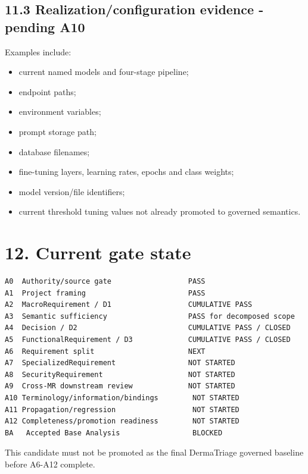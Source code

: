 \documentclass[11pt,a4paper]{article}
\providecommand{\tightlist}{\setlength{\itemsep}{0pt}\setlength{\parskip}{0pt}}
\begin{document}
\subsection{11.3 Realization/configuration evidence - pending
A10}\label{113-realizationconfiguration-evidence---pending-a10}

Examples include:

\begin{itemize}
\tightlist
\item
  current named models and four-stage pipeline;
\item
  endpoint paths;
\item
  environment variables;
\item
  prompt storage path;
\item
  database filenames;
\item
  fine-tuning layers, learning rates, epochs and class weights;
\item
  model version/file identifiers;
\item
  current threshold tuning values not already promoted to governed
  semantics.
\end{itemize}

\section{12. Current gate state}\label{12-current-gate-state}

\begin{verbatim}
A0  Authority/source gate                  PASS
A1  Project framing                        PASS
A2  MacroRequirement / D1                  CUMULATIVE PASS
A3  Semantic sufficiency                   PASS for decomposed scope
A4  Decision / D2                          CUMULATIVE PASS / CLOSED
A5  FunctionalRequirement / D3             CUMULATIVE PASS / CLOSED
A6  Requirement split                      NEXT
A7  SpecializedRequirement                 NOT STARTED
A8  SecurityRequirement                    NOT STARTED
A9  Cross-MR downstream review             NOT STARTED
A10 Terminology/information/bindings        NOT STARTED
A11 Propagation/regression                  NOT STARTED
A12 Completeness/promotion readiness        NOT STARTED
BA   Accepted Base Analysis                 BLOCKED
\end{verbatim}

This candidate must not be promoted as the final DermaTriage governed
baseline before A6-A12 complete.
\end{document}
